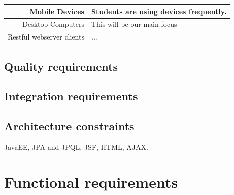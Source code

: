 \documentclass[a4paper,12pt]{report}
\begin{document}
\begin{tabular}{|r|l|}
\hline
Mobile Devices & Students are using devices frequently. \\
\hline
Desktop Computers &  This will be our main focus\\
\hline
Restful webserver clients & ... \\
\hline
\end{tabular}

\subsection{Quality requirements}
\subsection{Integration requirements}
\subsection{Architecture constraints}
JavaEE, JPA and JPQL, JSF, HTML,
AJAX.
\section{Functional requirements}
\end{document}
